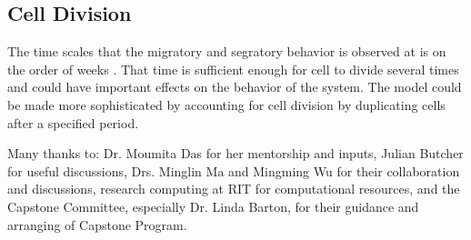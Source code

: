 \documentclass[aps,prb,twocolumn,groupedaddress,nofootinbib,floatfix]{revtex4}
\begin{document}
\subsection{Cell Division}

The time scales that the migratory and segratory behavior is observed at is on the order of weeks \cite{Mingming}.
That time is sufficient enough for cell to divide several times and could have important effects on the behavior of the system.
The model could be made more sophisticated by accounting for cell division by duplicating cells after a specified period.

\begin{acknowledgments}
Many thanks to: Dr. Moumita Das for her mentorship and inputs, Julian Butcher for useful discussions, Drs. Minglin Ma and Mingming Wu for their collaboration and discussions, research computing at RIT for computational resources, and the Capstone Committee, especially Dr. Linda Barton, for their guidance and arranging of Capstone Program.
\end{acknowledgments}

\vspace{0.6in}
%
%



\end{document}
